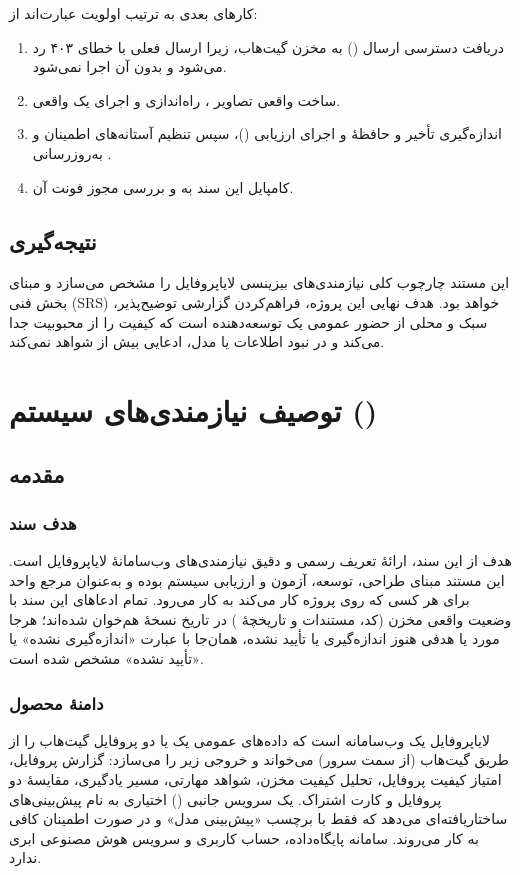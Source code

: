 \documentclass[12pt]{article}
\newcommand{\code}[1]{\lr{\texttt{#1}}}
\begin{document}
 کارهای بعدی به ترتیب اولویت عبارت‌اند از:

 \begin{enumerate}
\item دریافت دسترسی ارسال () به مخزن گیت‌هاب، زیرا ارسال فعلی با خطای ۴۰۳ رد می‌شود و بدون آن  اجرا نمی‌شود.
\item ساخت واقعی تصاویر ، راه‌اندازی  و اجرای یک  واقعی.
\item اندازه‌گیری تأخیر و حافظهٔ  و اجرای ارزیابی (\code{scripts/eval-laya.mjs})، سپس تنظیم آستانه‌های اطمینان و به‌روزرسانی \code{docs/LAYA.md}.
\item کامپایل این سند به  و بررسی مجوز فونت آن.
\end{enumerate}
 \subsection{نتیجه‌گیری}
این مستند چارچوب کلی نیازمندی‌های بیزینسی لایاپروفایل را مشخص می‌سازد و مبنای بخش فنی (SRS) خواهد بود. هدف نهایی این پروژه، فراهم‌کردن گزارشی توضیح‌پذیر، سبک و محلی از حضور عمومی یک توسعه‌دهنده است که کیفیت را از محبوبیت جدا می‌کند و در نبود اطلاعات یا مدل، ادعایی بیش از شواهد نمی‌کند.
\section{توصیف نیازمندی‌های سیستم ()}
 \subsection{مقدمه}
 \subsubsection{هدف سند}
هدف از این سند، ارائهٔ تعریف رسمی و دقیق نیازمندی‌های وب‌سامانهٔ لایاپروفایل است. این مستند مبنای طراحی، توسعه، آزمون و ارزیابی سیستم بوده و به‌عنوان مرجع واحد برای هر کسی که روی پروژه کار می‌کند به کار می‌رود. تمام ادعاهای این سند با وضعیت واقعی مخزن (کد، مستندات و تاریخچهٔ ) در تاریخ نسخهٔ  هم‌خوان شده‌اند؛ هرجا مورد یا هدفی هنوز اندازه‌گیری یا تأیید نشده، همان‌جا با عبارت «اندازه‌گیری نشده» یا «تأیید نشده» مشخص شده است.
 \subsubsection{دامنهٔ محصول}
لایاپروفایل یک وب‌سامانه است که داده‌های عمومی یک یا دو پروفایل گیت‌هاب را از طریق  گیت‌هاب (از سمت سرور) می‌خواند و خروجی زیر را می‌سازد: گزارش پروفایل، امتیاز کیفیت پروفایل، تحلیل کیفیت مخزن، شواهد مهارتی، مسیر یادگیری، مقایسهٔ دو پروفایل و کارت اشتراک. یک سرویس جانبی () اختیاری به نام  پیش‌بینی‌های ساختاریافته‌ای می‌دهد که فقط با برچسب «پیش‌بینی مدل» و در صورت اطمینان کافی به کار می‌روند. سامانه پایگاه‌داده، حساب کاربری و سرویس هوش مصنوعی ابری ندارد.
\end{document}
